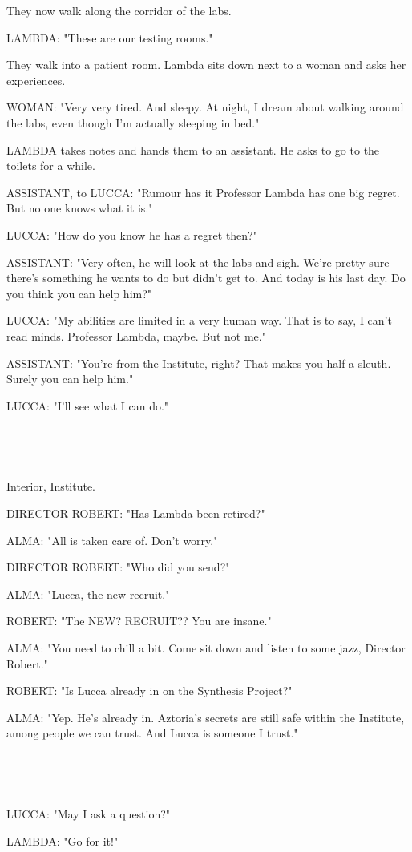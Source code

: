 \documentclass[11pt]{article}
\begin{document}
They now walk along the corridor of the labs.

LAMBDA: "These are our testing rooms."

They walk into a patient room.
Lambda sits down next to a woman and asks her experiences.

WOMAN: "Very very tired. 
And sleepy. 
At night, I dream about walking around the labs, even though I'm actually sleeping in bed."

LAMBDA takes notes and hands them to an assistant.
He asks to go to the toilets for a while.

ASSISTANT, to LUCCA: "Rumour has it Professor Lambda has one big regret.
But no one knows what it is."

LUCCA: "How do you know he has a regret then?"

ASSISTANT: "Very often, he will look at the labs and sigh.
We're pretty sure there's something he wants to do but didn't get to.
And today is his last day.
Do you think you can help him?"

LUCCA: "My abilities are limited in a very human way.
That is to say, I can't read minds.
Professor Lambda, maybe. But not me."

ASSISTANT: "You're from the Institute, right? 
That makes you half a sleuth.
Surely you can help him."

LUCCA: "I'll see what I can do."

\ 

\ 

Interior, Institute.

DIRECTOR ROBERT: "Has Lambda been retired?"

ALMA: "All is taken care of. Don't worry."

DIRECTOR ROBERT: "Who did you send?"

ALMA: "Lucca, the new recruit."

ROBERT: "The NEW? RECRUIT?? You are insane."

ALMA: "You need to chill a bit.
Come sit down and listen to some jazz, Director Robert."

ROBERT: "Is Lucca already in on the Synthesis Project?"

ALMA: "Yep. He's already in. 
Aztoria's secrets are still safe within the Institute, among people we can trust.
And Lucca is someone I trust."

\ 

\ 

LUCCA: "May I ask a question?"

LAMBDA: "Go for it!"
\end{document}
